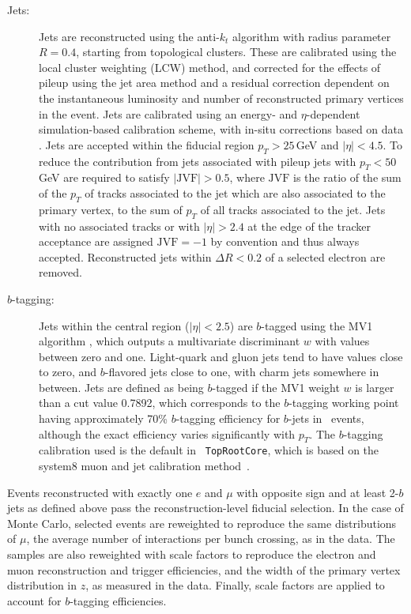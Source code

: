 \begin{description}
\item[Jets:] Jets are reconstructed using the anti-$k_t$ algorithm 
\cite{antikt1,antikt2,antikt3} with radius parameter $R=0.4$, 
starting from topological clusters. These are calibrated
using the local cluster weighting (LCW) method, and corrected for the
effects of pileup using the jet area method and a residual correction dependent
on the instantaneous luminosity and number of reconstructed primary vertices 
in the event. Jets are calibrated using an energy- and $\eta$-dependent simulation-based calibration scheme, with in-situ corrections 
based on data \cite{jesxi}. Jets are accepted within the fiducial region $p_T>25$\,GeV and $|\eta|<4.5$. To reduce the contribution from jets 
associated with pileup jets with $p_T<50$\,GeV
are required to satisfy $|\textrm{JVF}|>0.5$, where $\textrm{JVF}$ is
the ratio of the sum of the $p_T$ of tracks associated to the jet which
are also associated to the primary vertex, to the sum of $p_T$ of all
tracks associated to the jet. Jets with no associated tracks or with
$|\eta|>2.4$ at the edge of the tracker acceptance  are assigned
$\textrm{JVF}=-1$ by convention and thus always accepted.
Reconstructed jets 
within $\Delta R<0.2$ of a selected electron are removed.

\item[$b$-tagging:] Jets within the central region ($|\eta| < 2.5$) are $b$-tagged using the MV1 algorithm 
\cite{btagcom,btagptrel}, which outputs a multivariate discriminant $w$ with values between zero and one. 
Light-quark and gluon jets tend to have values close to zero, and 
$b$-flavored jets close to one, with charm jets somewhere in between. Jets are defined as being $b$-tagged if the MV1 weight $w$ is larger than a cut value 0.7892, which corresponds to the $b$-tagging working 
point having approximately 70\% $b$-tagging efficiency for $b$-jets in \ttbar\ events, although the exact efficiency varies significantly with $p_T$. The $b$-tagging calibration used is the default in \texttt{ TopRootCore}, which is based on the system8 muon and jet calibration method~\cite{btagsys8}.
\end{description}
Events reconstructed with exactly one $e$ and $\mu$ with opposite sign and at least 2-$b$ jets as defined above pass the reconstruction-level fiducial selection. In the case of Monte Carlo, selected events are reweighted to reproduce the same distributions of $\mu$, the average number of interactions per bunch crossing, as in the data. The samples are also reweighted with scale factors to reproduce the electron and muon reconstruction and trigger efficiencies, and the width of the primary vertex distribution in $z$, as measured in the data. Finally, scale factors are applied to account for $b$-tagging efficiencies.

